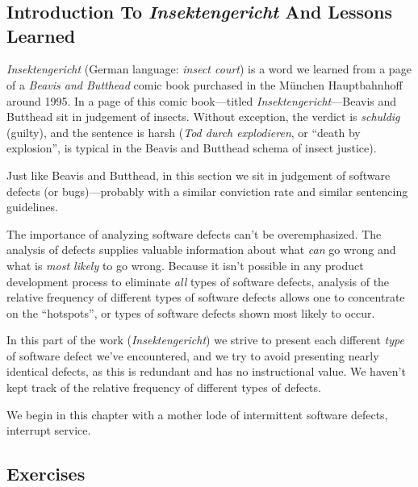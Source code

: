 \chapter{\cirdzerolongtitle{}}

\label{cird0}

\section{Introduction To \emph{Insektengericht} And Lessons Learned}

\emph{Insektengericht}
(German language:  \emph{insect court}) is a word
we learned from a page of a \emph{Beavis and Butthead}
comic book purchased
in the M\"unchen Hauptbahnhoff around 1995.  In a page of this comic
book---titled \emph{Insektengericht}---Beavis and Butthead sit in judgement
of insects.  Without exception, the verdict is
\emph{schuldig} (guilty), and the sentence is harsh
(\emph{Tod durch explodieren}, or ``death by explosion'', is typical in the
Beavis and Butthead schema of insect justice).

Just like Beavis and Butthead, in this section we sit in judgement of software
defects (or bugs)---probably with a similar conviction rate and similar
sentencing guidelines.

The importance of analyzing software defects can't be overemphasized.
The analysis of defects supplies valuable information about what 
\emph{can} go wrong and what is \emph{most likely} to go wrong.
Because it isn't possible in any product development
process to eliminate \emph{all} types of
software defects, analysis of the relative frequency
of different types of software defects allows
one to concentrate on the ``hotspots'', or types of
software defects shown most likely to occur.

In this part of the work (\emph{Insektengericht}) we strive
to present each different \emph{type} of software defect we've
encountered, and we try to avoid presenting nearly
identical defects, as this is redundant and has no 
instructional value.  We haven't kept track of 
the relative frequency of different types of defects.

We begin in this chapter with a mother lode of intermittent software defects, 
interrupt service.


\section{Exercises}


